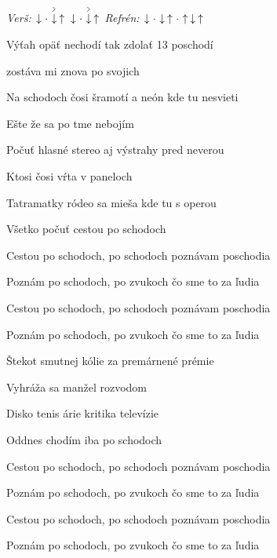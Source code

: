 \begin{song}


 \quad
\textit{Verš:} $\Down\Miss\AccentDown\Up\ \Down\Miss\AccentDown\Up$ \quad
\textit{Refrén:} $\Down\Miss\Down\Up\Miss\Up\Down\Up$

\Large


\Large

\bigskip

Výťah opäť nechodí tak zdolať 13 poschodí \par
{}zostáva mi znova po svojich \par
Na schodoch čosi šramotí a neón kde tu nesvieti \par
{}Ešte že sa po tme nebojím \par

\bigskip

Počuť hlasné stereo aj výstrahy pred neverou \par
{}Ktosi čosi vŕta v paneloch \par
{}Tatramatky ródeo sa mieša kde tu s operou \par
{}Všetko počuť cestou po schodoch \par

\bigskip

Cestou po schodoch, po schodoch poznávam poschodia \par
Poznám po schodoch, po zvukoch čo sme to za ľudia \par
Cestou po schodoch, po schodoch poznávam poschodia \par
Poznám po schodoch, po zvukoch čo sme to za ľudia \par

\bigskip

Štekot smutnej kólie za premárnené prémie \par
{}Vyhráža sa manžel rozvodom \par
{}Disko tenis árie kritika televízie \par
{}Oddnes chodím iba po schodoch \par

\bigskip

Cestou po schodoch, po schodoch poznávam poschodia \par
Poznám po schodoch, po zvukoch čo sme to za ľudia \par
Cestou po schodoch, po schodoch poznávam poschodia \par
Poznám po schodoch, po zvukoch čo sme to za ľudia \par

\end{song}
